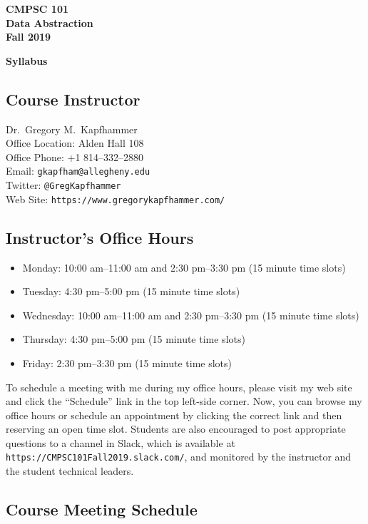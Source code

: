 \documentclass[11pt]{article}
\newcommand{\url}[1]{\lstinline{#1}}
\newcommand{\syllabustitle}[1]
{
  \begin{center}
    \begin{center}
      \bf
      CMPSC 101\\Data Abstraction\\
      Fall 2019\\
      \medskip
    \end{center}
    \bf
    #1
  \end{center}
}
\begin{document}
\thispagestyle{empty}

\syllabustitle{Syllabus}

\subsection*{Course Instructor}
Dr.\ Gregory M.\ Kapfhammer\\
\noindent Office Location: Alden Hall 108 \\
\noindent Office Phone: +1 814--332--2880 \\
\noindent Email: \url{gkapfham@allegheny.edu} \\
\noindent Twitter: \url{@GregKapfhammer} \\
\noindent Web Site: \url{https://www.gregorykapfhammer.com/}

\subsection*{Instructor's Office Hours}

\begin{itemize}
  \itemsep.25em

  \item Monday: 10:00 am--11:00 am and 2:30 pm--3:30 pm (15 minute time slots)

  \item Tuesday: 4:30 pm--5:00 pm (15 minute time slots)

  \item Wednesday: 10:00 am--11:00 am and 2:30 pm--3:30 pm (15 minute time slots)

  \item Thursday: 4:30 pm--5:00 pm (15 minute time slots)

  \item Friday: 2:30 pm--3:30 pm (15 minute time slots)

\end{itemize}

\noindent To schedule a meeting with me during my office hours, please visit my
web site and click the ``Schedule'' link in the top left-side corner. Now, you
can browse my office hours or schedule an appointment by clicking the correct
link and then reserving an open time slot. Students are also encouraged to post
appropriate questions to a channel in Slack, which is available at
\url{https://CMPSC101Fall2019.slack.com/}, and monitored by the instructor and
the student technical leaders.

\subsection*{Course Meeting Schedule}
\end{document}
